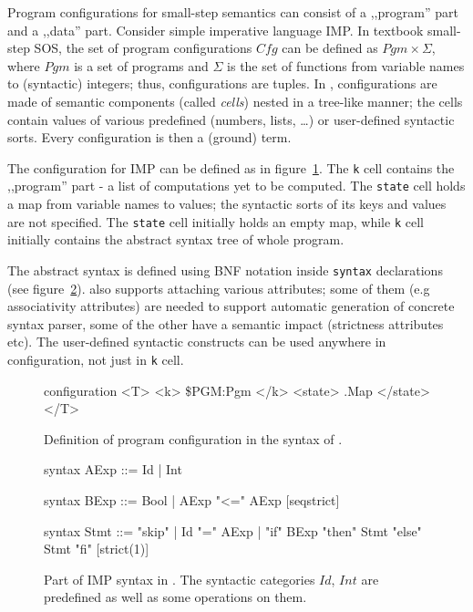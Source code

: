 \documentclass{fithesis3}
\newcommand{\var}[1]{\mathit{#1}}
\begin{document}

Program configurations for small-step semantics can consist of a ,,program'' part and a ,,data'' part. Consider simple imperative language IMP. In textbook small-step SOS, the set of program configurations $\var{Cfg}$ can be defined as $\var{Pgm} \times \Sigma$, where $\var{Pgm}$ is a set of programs and $\Sigma$ is the set of functions from variable names to (syntactic) integers; thus, configurations are tuples. In \K, configurations are made of semantic components (called \textit{cells}) nested in a tree-like manner; the cells contain values of various predefined (numbers, lists, \ldots) or user-defined syntactic sorts. Every configuration is then a (ground) term.

The configuration for IMP can be defined as in figure~\ref{ImpConfigurationInK}. The \texttt{k} cell contains the ,,program'' part - a list of computations yet to be computed. The \texttt{state} cell holds a map from variable names to values; the syntactic sorts of its keys and values are not specified. The \texttt{state} cell initially holds an empty map, while \texttt{k} cell initially contains the abstract syntax tree of whole program.

The abstract syntax is defined using BNF notation inside \texttt{syntax} declarations (see figure~\ref{ImpSyntaxInK}). \K also supports attaching various attributes; some of them (e.g associativity attributes) are needed to support automatic generation of concrete syntax parser, some of the other have a semantic impact (strictness attributes etc). The user-defined syntactic constructs can be used anywhere in configuration, not just in \texttt{k} cell.

\begin{figure}
\caption{Definition of program configuration in the syntax of \K. }
\label{ImpConfigurationInK}
\begin{asciik}
configuration <T> <k> \$PGM:Pgm </k> <state> .Map </state> </T>
\end{asciik}
\end{figure}

\begin{figure}
\caption{Part of IMP syntax in \K. The syntactic categories $\var{Id}$, $\var{Int}$ are predefined as well as some operations on them. }
\label{ImpSyntaxInK}
\begin{asciik}
syntax AExp ::= Id | Int

syntax BExp  ::= Bool
| AExp "<=" AExp [seqstrict]

syntax Stmt  ::= "skip"
| Id "=" AExp
| "if" BExp "then" Stmt "else" Stmt "fi" [strict(1)]
\end{asciik}
\end{figure}
\end{document}
